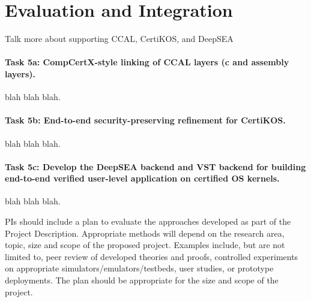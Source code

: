 \section{Evaluation and Integration}

Talk more about supporting CCAL, CertiKOS, and DeepSEA


\paragraph*{Task 5a: CompCertX-style linking of CCAL layers (c and assembly layers).}
blah blah blah.

\paragraph*{Task 5b: End-to-end security-preserving refinement for CertiKOS.}
blah blah blah.

\paragraph*{Task 5c: Develop the DeepSEA backend and VST backend for building end-to-end verified user-level application on certified OS kernels.}
blah blah blah.


PIs should include a plan to evaluate the approaches developed as part
of the Project Description. Appropriate methods will depend on the
research area, topic, size and scope of the proposed project. Examples
include, but are not limited to, peer review of developed theories and
proofs, controlled experiments on appropriate
simulators/emulators/testbeds, user studies, or prototype
deployments. The plan should be appropriate for the size and scope of
the project.
